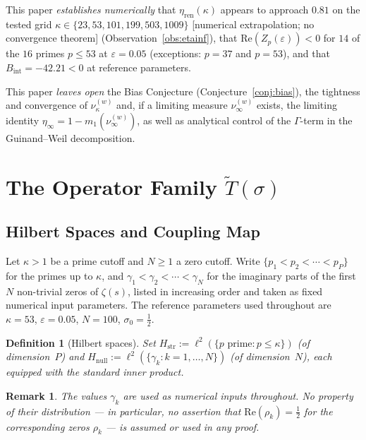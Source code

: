 \documentclass[11pt]{article}
\newtheorem{definition}[theorem]{Definition}
\newtheorem*{remark}{Remark}
\newcommand{\Hstr}{H_{\mathrm{str}}}
\newcommand{\Hnull}{H_{\mathrm{null}}}
\newcommand{\etaren}{\eta_{\mathrm{ren}}}
\newcommand{\Tt}{\widetilde{T}}
\begin{document}
This paper \emph{establishes numerically} that
$\etaren(\kappa)$ appears to approach $0.81$ on the tested
grid $\kappa\in\{23,53,101,199,503,1009\}$
[numerical extrapolation; no convergence theorem]
(Observation~\ref{obs:etainf}),
that $\mathrm{Re}(Z_p(\varepsilon))<0$ for $14$ of the $16$
primes $p\leq 53$ at $\varepsilon=0.05$
(exceptions: $p=37$ and $p=53$), and that
$B_{\mathrm{int}} = -42.21 < 0$ at reference parameters.

This paper \emph{leaves open} the Bias Conjecture
(Conjecture~\ref{conj:bias}), the tightness and convergence of
$\nu_\kappa^{(w)}$ and, if a limiting measure $\nu_\infty^{(w)}$
exists, the limiting identity
$\eta_\infty=1-m_1(\nu_\infty^{(w)})$,
as well as analytical control of the $\Gamma$-term in the
Guinand--Weil decomposition.

\section{The Operator Family \texorpdfstring{$\Tt(\sigma)$}{T-tilde(sigma)}}
\label{sec:ops}

\subsection{Hilbert Spaces and Coupling Map}

Let $\kappa>1$ be a prime cutoff and $N\geq 1$ a zero cutoff.
Write $\{p_1<p_2<\cdots<p_P\}$ for the primes up to $\kappa$,
and $\gamma_1<\gamma_2<\cdots<\gamma_N$ for the imaginary parts
of the first $N$ non-trivial zeros of $\zeta(s)$, listed in
increasing order and taken as fixed numerical input parameters.
The reference parameters used throughout are
$\kappa=53$, $\varepsilon=0.05$, $N=100$, $\sigma_0=\tfrac{1}{2}$.

\begin{definition}[Hilbert spaces]
\label{def:spaces}
Set $\Hstr := \ell^2(\{p\text{ prime}: p\leq\kappa\})$
(of dimension~$P$) and $\Hnull := \ell^2(\{\gamma_k: k=1,\ldots,N\})$
(of dimension~$N$), each equipped with the standard inner product.
\end{definition}

\begin{remark}
The values $\gamma_k$ are used as numerical inputs throughout.
No property of their distribution --- in particular, no assertion
that $\mathrm{Re}(\rho_k)=\tfrac{1}{2}$ for the corresponding
zeros $\rho_k$ --- is assumed or used in any proof.
\end{remark}
\end{document}
